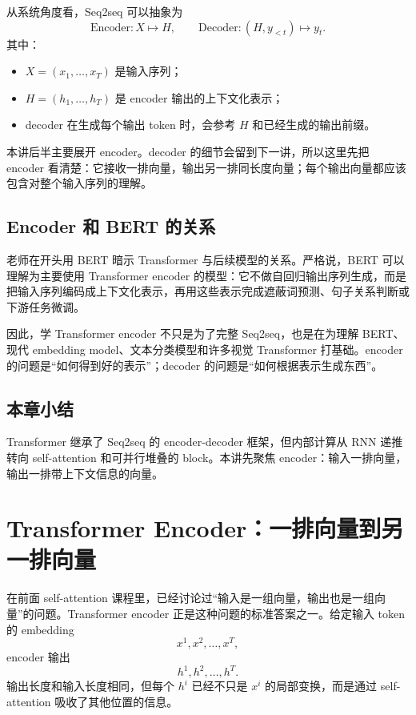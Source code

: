 \documentclass[a4paper]{article}
\begin{document}
从系统角度看，Seq2seq 可以抽象为
\[
    \text{Encoder}: X \mapsto H,\qquad
    \text{Decoder}: (H, y_{<t}) \mapsto y_t.
\]
其中：
\begin{itemize}
    \item $X=(x_1,\ldots,x_T)$ 是输入序列；
    \item $H=(h_1,\ldots,h_T)$ 是 encoder 输出的上下文化表示；
    \item decoder 在生成每个输出 token 时，会参考 $H$ 和已经生成的输出前缀。
\end{itemize}

本讲后半主要展开 encoder。decoder 的细节会留到下一讲，所以这里先把 encoder 看清楚：它接收一排向量，输出另一排同长度向量；每个输出向量都应该包含对整个输入序列的理解。

\subsection{Encoder 和 BERT 的关系}

老师在开头用 BERT 暗示 Transformer 与后续模型的关系。严格说，BERT 可以理解为主要使用 Transformer encoder 的模型：它不做自回归输出序列生成，而是把输入序列编码成上下文化表示，再用这些表示完成遮蔽词预测、句子关系判断或下游任务微调。

因此，学 Transformer encoder 不只是为了完整 Seq2seq，也是在为理解 BERT、现代 embedding model、文本分类模型和许多视觉 Transformer 打基础。encoder 的问题是“如何得到好的表示”；decoder 的问题是“如何根据表示生成东西”。

\subsection{本章小结}

Transformer 继承了 Seq2seq 的 encoder-decoder 框架，但内部计算从 RNN 递推转向 self-attention 和可并行堆叠的 block。本讲先聚焦 encoder：输入一排向量，输出一排带上下文信息的向量。

\section{Transformer Encoder：一排向量到另一排向量}

在前面 self-attention 课程里，已经讨论过“输入是一组向量，输出也是一组向量”的问题。Transformer encoder 正是这种问题的标准答案之一。给定输入 token 的 embedding
\[
    x^1,x^2,\ldots,x^T,
\]
encoder 输出
\[
    h^1,h^2,\ldots,h^T.
\]
输出长度和输入长度相同，但每个 $h^i$ 已经不只是 $x^i$ 的局部变换，而是通过 self-attention 吸收了其他位置的信息。
\end{document}
